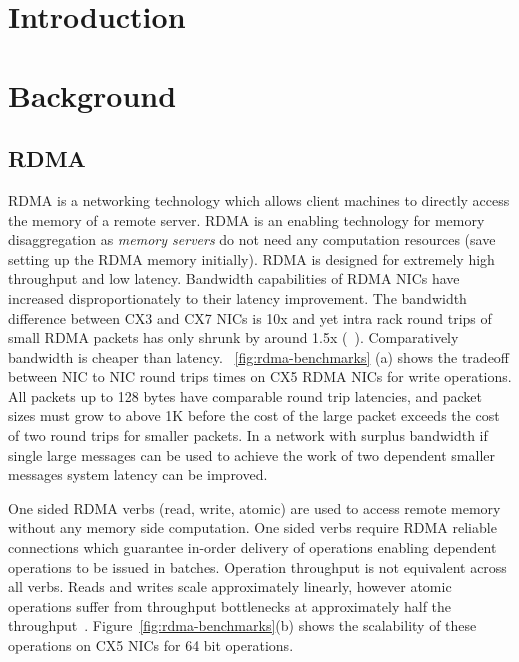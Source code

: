 \section{Introduction}
\label{sec:intro}


\section{Background}
\label{sec:background}

\subsection{RDMA}

RDMA is a networking technology which allows client machines
to directly access the memory of a remote server. RDMA is an
enabling technology for memory disaggregation as
\textit{memory servers} do not need any computation
resources (save setting up the RDMA memory initially). RDMA
is designed for extremely high throughput and low latency.
Bandwidth capabilities of RDMA NICs have increased
disproportionately to their latency improvement. The
bandwidth difference between CX3 and CX7 NICs is 10x and yet
intra rack round trips of small RDMA packets has only shrunk
by around 1.5x (~). Comparatively bandwidth is
cheaper than latency. ~\ref{fig:rdma-benchmarks} (a) shows
the tradeoff between NIC to NIC round trips times on CX5
RDMA NICs for write operations. All packets up to 128 bytes
have comparable round trip latencies, and packet sizes must
grow to above 1K before the cost of the large packet exceeds
the cost of two round trips for smaller packets. In a
network with surplus bandwidth if single large messages can
be used to achieve the work of two dependent smaller
messages system latency can be improved.

One sided RDMA verbs (read, write, atomic) are used to
access remote memory without any memory side computation.
One sided verbs require RDMA reliable connections which
guarantee in-order delivery of operations enabling dependent
operations to be issued in batches. Operation throughput is
not equivalent across all verbs. Reads and writes scale
approximately linearly, however atomic operations suffer
from throughput bottlenecks at approximately half the
throughput~\cite{design-guidelines,sherman}.
Figure~\ref{fig:rdma-benchmarks}(b) shows the scalability of
these operations on CX5 NICs for 64 bit operations.

